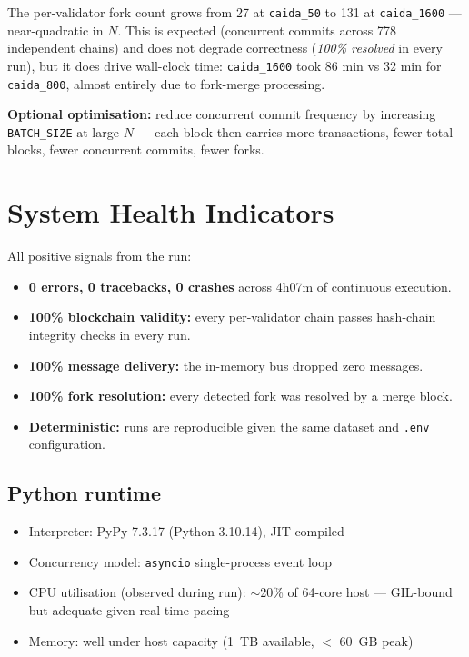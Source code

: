 \documentclass[10pt,a4paper]{article}
\begin{document}
The per-validator fork count grows from 27 at \texttt{caida\_50} to 131
at \texttt{caida\_1600} --- near-quadratic in $N$. This is expected
(concurrent commits across 778 independent chains) and does not degrade
correctness (\emph{100\% resolved} in every run), but it does drive
wall-clock time: \texttt{caida\_1600} took 86 min vs 32 min for
\texttt{caida\_800}, almost entirely due to fork-merge processing.

\textbf{Optional optimisation:} reduce concurrent commit frequency by
increasing \texttt{BATCH\_SIZE} at large $N$ --- each block then
carries more transactions, fewer total blocks, fewer concurrent commits,
fewer forks.

\newpage
\section{System Health Indicators}
\label{sec:health}

All positive signals from the run:
\begin{itemize}
\item \textbf{0 errors, 0 tracebacks, 0 crashes} across 4h07m of continuous execution.
\item \textbf{100\% blockchain validity:} every per-validator chain passes hash-chain integrity checks in every run.
\item \textbf{100\% message delivery:} the in-memory bus dropped zero messages.
\item \textbf{100\% fork resolution:} every detected fork was resolved by a merge block.
\item \textbf{Deterministic:} runs are reproducible given the same dataset and \texttt{.env} configuration.
\end{itemize}

\subsection{Python runtime}
\begin{itemize}
\item Interpreter: PyPy 7.3.17 (Python 3.10.14), JIT-compiled
\item Concurrency model: \texttt{asyncio} single-process event loop
\item CPU utilisation (observed during run): $\sim$20\% of 64-core host --- GIL-bound but adequate given real-time pacing
\item Memory: well under host capacity (1~TB available, $<$ 60~GB peak)
\end{itemize}
\end{document}
